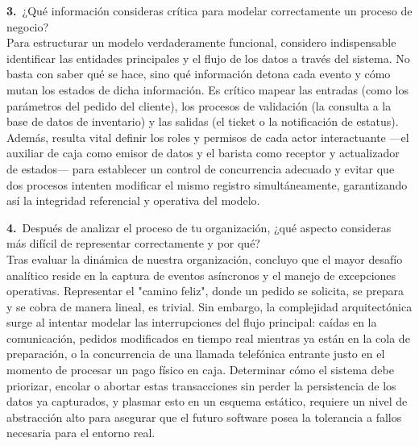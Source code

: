 \documentclass[12pt,letterpaper]{article}
\newcommand{\negr}[1]{\textsf{\bfseries\color{verde} #1}}
\begin{document}
\vspace{0.4cm}
\noindent\negr{3.}\ ¿Qué información consideras crítica para modelar correctamente un proceso de negocio?\\
Para estructurar un modelo verdaderamente funcional, considero indispensable identificar las entidades principales y el flujo de los datos a través del sistema. No basta con saber qué se hace, sino qué información detona cada evento y cómo mutan los estados de dicha información. Es crítico mapear las entradas (como los parámetros del pedido del cliente), los procesos de validación (la consulta a la base de datos de inventario) y las salidas (el ticket o la notificación de estatus). Además, resulta vital definir los roles y permisos de cada actor interactuante —el auxiliar de caja como emisor de datos y el barista como receptor y actualizador de estados— para establecer un control de concurrencia adecuado y evitar que dos procesos intenten modificar el mismo registro simultáneamente, garantizando así la integridad referencial y operativa del modelo.

\vspace{0.4cm}
\noindent\negr{4.}\ Después de analizar el proceso de tu organización, ¿qué aspecto consideras más difícil de representar correctamente y por qué?\\
Tras evaluar la dinámica de nuestra organización, concluyo que el mayor desafío analítico reside en la captura de eventos asíncronos y el manejo de excepciones operativas. Representar el "camino feliz", donde un pedido se solicita, se prepara y se cobra de manera lineal, es trivial. Sin embargo, la complejidad arquitectónica surge al intentar modelar las interrupciones del flujo principal: caídas en la comunicación, pedidos modificados en tiempo real mientras ya están en la cola de preparación, o la concurrencia de una llamada telefónica entrante justo en el momento de procesar un pago físico en caja. Determinar cómo el sistema debe priorizar, encolar o abortar estas transacciones sin perder la persistencia de los datos ya capturados, y plasmar esto en un esquema estático, requiere un nivel de abstracción alto para asegurar que el futuro software posea la tolerancia a fallos necesaria para el entorno real.

\clearpage
\end{document}
